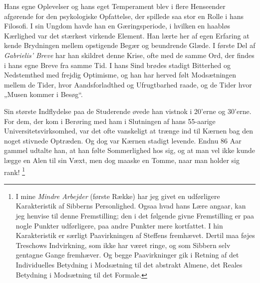 \documentclass[12pt,a4paper,openany]{book}
\begin{document}
Hans egne Oplevelser og hans eget Temperament blev i flere Henseender afgørende
for den psykologiske Opfattelse, der spillede saa stor en Rolle i hans
Filosofi. I sin Ungdom havde han en Gæringsperiode, i hvilken en haabløs
Kærlighed var det stærkest virkende Element. Han lærte her af egen Erfaring at
kende Brydningen mellem opstigende Begær og beundrende Glæde. I første Del af
\textit{Gabrielis' Breve} har han skildret denne Krise, ofte med de samme Ord,
der findes i hans egne Breve fra samme Tid. I hans Sind brødes stadigt
Bitterhed og Nedstemthed med frejdig Optimisme, og han har herved følt
Modsætningen mellem de Tider, hvor Aandsforladthed og Ufrugtbarhed raade, og de
Tider hvor „Musen kommer i Besøg“.

Sin største Indflydelse paa de Studerende øvede han vistnok i 20'erne og
30'erne. For dem, der kom i Berøring med ham i Slutningen af hans 55-aarige
Universitetsvirksomhed, var det ofte vanskeligt at trænge ind til Kærnen bag
den noget stivnede Optræden. Og dog var Kærnen stadigt levende. Endnu 86 Aar
gammel udtalte han, at han følte Sommerlighed hos sig, og at man vel ikke kunde
lægge en Alen til sin Væxt, men dog maaske en Tomme, naar man holder sig rank!%
\footnote[2]{I mine \textit{Mindre Arbejder} (første Række) har jeg givet en
udførligere Karakteristik af Sibberns Personlighed. Ogsaa hvad hans Lære
angaar, kan jeg henvise til denne Fremstilling; den i det følgende givne
Fremstilling er paa nogle Punkter udførligere, paa andre Punkter mere
kortfattet. I hin Karakteristik er særligt Paavirkningen af Steffens fremhævet.
Dertil maa føjes Treschows Indvirkning, som ikke har været ringe, og som
Sibbern selv gentagne Gange fremhæver. Og begge Paavirkninger gik i Retning af
det Individuelles Betydning i Modsætning til det abstrakt Almene, det Reales
Betydning i Modsætning til det Formale.}
\end{document}
